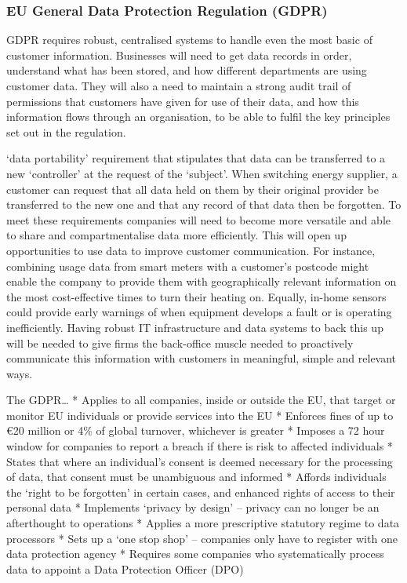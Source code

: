 \documentclass[]{book}
\newcommand{\euro}{€}
\theoremstyle{definition}
\theoremstyle{definition}
\theoremstyle{definition}
\theoremstyle{remark}
\begin{document}
\subsubsection{EU General Data Protection Regulation
(GDPR)}\label{eu-general-data-protection-regulation-gdpr-1}

GDPR requires robust, centralised systems to handle even the most basic
of customer information. Businesses will need to get data records in
order, understand what has been stored, and how different departments
are using customer data. They will also a need to maintain a strong
audit trail of permissions that customers have given for use of their
data, and how this information flows through an organisation, to be able
to fulfil the key principles set out in the regulation.

`data portability' requirement that stipulates that data can be
transferred to a new `controller' at the request of the `subject'. When
switching energy supplier, a customer can request that all data held on
them by their original provider be transferred to the new one and that
any record of that data then be forgotten. To meet these requirements
companies will need to become more versatile and able to share and
compartmentalise data more efficiently. This will open up opportunities
to use data to improve customer communication. For instance, combining
usage data from smart meters with a customer's postcode might enable the
company to provide them with geographically relevant information on the
most cost-effective times to turn their heating on. Equally, in-home
sensors could provide early warnings of when equipment develops a fault
or is operating inefficiently. Having robust IT infrastructure and data
systems to back this up will be needed to give firms the back-office
muscle needed to proactively communicate this information with customers
in meaningful, simple and relevant ways.

The GDPR\ldots{} * Applies to all companies, inside or outside the EU,
that target or monitor EU individuals or provide services into the EU *
Enforces fines of up to \euro{}20 million or 4\% of global turnover,
whichever is greater * Imposes a 72 hour window for companies to report
a breach if there is risk to affected individuals * States that where an
individual's consent is deemed necessary for the processing of data,
that consent must be unambiguous and informed * Affords individuals the
`right to be forgotten' in certain cases, and enhanced rights of access
to their personal data * Implements `privacy by design' -- privacy can
no longer be an afterthought to operations * Applies a more prescriptive
statutory regime to data processors * Sets up a `one stop shop' --
companies only have to register with one data protection agency *
Requires some companies who systematically process data to appoint a
Data Protection Officer (DPO)
\end{document}

